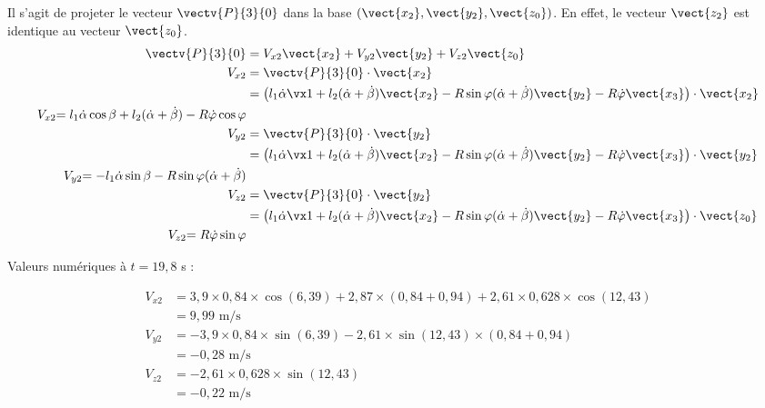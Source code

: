 \begin{corrige}

Il s'agit de projeter le vecteur $\vectv{P}{3}{0}$ dans la base $(\vect{x_2}, \vect{y_2} ,\vect{z_0})$. En effet, le vecteur $\vect{z_2}$ est identique au vecteur $\vect{z_0}$.
\begin{align*}
\vectv{P}{3}{0}&=V_{x2}\vect{x_2} +V_{y2}\vect{y_2} + V_{z2}\vect{z_0}\\
V_{x2}&=\vectv{P}{3}{0}\cdot\vect{x_2}\\
	&=\left(l_1\dot\alpha\vx1+l_2(\dot\alpha+\dot\beta)\vect{x_2}-R\sin\varphi(\dot\alpha+\dot\beta)\vect{y_2}-R\dot\varphi\vect{x_3}\right)\cdot\vect{x_2}\\
{V_{x2}}{=l_1 \dot\alpha\cos\beta+l_2 (\dot\alpha+\dot\beta) -R \dot\varphi\cos\varphi}\\
V_{y2}&=\vectv{P}{3}{0}\cdot\vect{y_2}\\
	&=\left(l_1\dot\alpha\vx1+l_2(\dot\alpha+\dot\beta)\vect{x_2}-R\sin\varphi(\dot\alpha+\dot\beta)\vect{y_2}-R\dot\varphi\vect{x_3}\right)\cdot\vect{y_2}\\
{V_{y2}}{=-l_1\dot\alpha\sin\beta-R\sin\varphi(\dot\alpha+\dot\beta)}\\
V_{z2}&=\vectv{P}{3}{0}\cdot\vect{y_2}\\
	&=\left(l_1\dot\alpha\vx1+l_2(\dot\alpha+\dot\beta)\vect{x_2}-R\sin\varphi(\dot\alpha+\dot\beta)\vect{y_2}-R\dot\varphi\vect{x_3}\right)\cdot\vect{z_0}\\
{V_{z2}}{=R\dot\varphi\sin\varphi}
\end{align*}

Valeurs numériques à $t=19,8$ s :

\begin{align*}
V_{x2}&=3,9\times 0,84 \times \cos (6,39) + 2,87  \times (0,84 + 0,94) + 2,61 \times 0,628 \times \cos (12,43) \\
	&=\boxed{9,99\text{ m/s}}\\
V_{y2}&=-3,9 \times 0,84 \times \sin(6,39) - 2,61 \times \sin(12,43) \times (0,84 + 0,94)\\
	&=\boxed{-0,28\text{ m/s}}\\
V_{z2}&=-2,61\times 0,628 \times \sin(12,43) \\
	&=\boxed{-0,22 \text{ m/s}}
\end{align*}

\end{corrige}\else\fi

